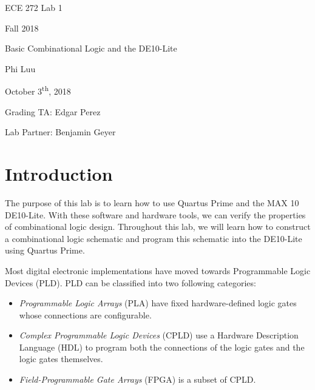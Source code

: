 \documentclass[12pt]{article}
\begin{document}
\begin{titlepage}
    \begin{center} \LARGE
        \vspace*{1.5in}

        ECE 272 Lab 1

        Fall 2018

        \vfill

        Basic Combinational Logic and the DE10-Lite

        Phi Luu

        \vfill

        October 3\textsuperscript{th}, 2018

        Grading TA: Edgar Perez

        Lab Partner: Benjamin Geyer

        \vspace{1.5in}
    \end{center}
\end{titlepage}

\section{Introduction}

The purpose of this lab is to learn how to use Quartus Prime and the MAX 10 DE10-Lite. With these software and hardware tools, we can verify the properties of combinational logic design. Throughout this lab, we will learn how to construct a combinational logic schematic and program this schematic into the DE10-Lite using Quartus Prime.

Most digital electronic implementations have moved towards Programmable Logic Devices (PLD). PLD can be classified into two following categories:

\begin{itemize}
    \item \textit{Programmable Logic Arrays} (PLA) have fixed hardware-defined logic gates whose connections are configurable.
    \item \textit{Complex Programmable Logic Devices} (CPLD) use a Hardware Description Language (HDL) to program both the connections of the logic gates and the logic gates themselves.
    \item \textit{Field-Programmable Gate Arrays} (FPGA) is a subset of CPLD.
\end{itemize}
\end{document}
